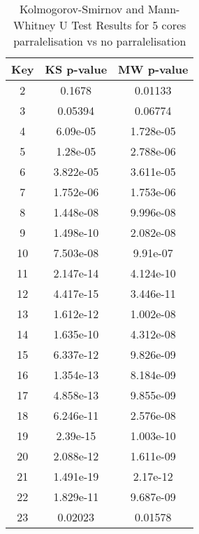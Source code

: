 \begin{table}[h!]
  \centering
  \caption{Kolmogorov-Smirnov and Mann-Whitney U Test Results for 5 cores parralelisation vs no parralelisation}
  \begin{tabular}{||c|c|c||}
    \toprule
    \textbf{Key} & \textbf{KS p-value} & \textbf{MW p-value} \\
    \midrule
    2            & 0.1678              & 0.01133             \\
    3            & 0.05394             & 0.06774             \\
    4            & 6.09e-05            & 1.728e-05           \\
    5            & 1.28e-05            & 2.788e-06           \\
    6            & 3.822e-05           & 3.611e-05           \\
    7            & 1.752e-06           & 1.753e-06           \\
    8            & 1.448e-08           & 9.996e-08           \\
    9            & 1.498e-10           & 2.082e-08           \\
    10           & 7.503e-08           & 9.91e-07            \\
    11           & 2.147e-14           & 4.124e-10           \\
    12           & 4.417e-15           & 3.446e-11           \\
    13           & 1.612e-12           & 1.002e-08           \\
    14           & 1.635e-10           & 4.312e-08           \\
    15           & 6.337e-12           & 9.826e-09           \\
    16           & 1.354e-13           & 8.184e-09           \\
    17           & 4.858e-13           & 9.855e-09           \\
    18           & 6.246e-11           & 2.576e-08           \\
    19           & 2.39e-15            & 1.003e-10           \\
    20           & 2.088e-12           & 1.611e-09           \\
    21           & 1.491e-19           & 2.17e-12            \\
    22           & 1.829e-11           & 9.687e-09           \\
    23           & 0.02023             & 0.01578             \\

\end{tabular}
\end{table}

